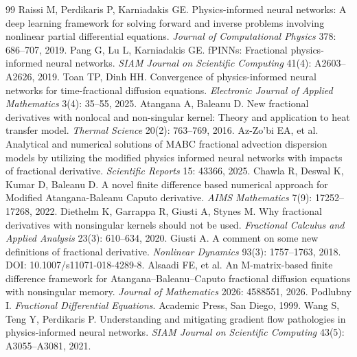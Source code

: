 \documentclass[11pt]{article}
\begin{document}
\begin{thebibliography}{99}
 Raissi M, Perdikaris P, Karniadakis GE. Physics-informed neural networks: A deep learning framework for solving forward and inverse problems involving nonlinear partial differential equations. \emph{Journal of Computational Physics} 378: 686--707, 2019.
 Pang G, Lu L, Karniadakis GE. fPINNs: Fractional physics-informed neural networks. \emph{SIAM Journal on Scientific Computing} 41(4): A2603--A2626, 2019.
 Toan TP, Dinh HH. Convergence of physics-informed neural networks for time-fractional diffusion equations. \emph{Electronic Journal of Applied Mathematics} 3(4): 35--55, 2025.
 Atangana A, Baleanu D. New fractional derivatives with nonlocal and non-singular kernel: Theory and application to heat transfer model. \emph{Thermal Science} 20(2): 763--769, 2016.
 Az-Zo'bi EA, et al. Analytical and numerical solutions of MABC fractional advection dispersion models by utilizing the modified physics informed neural networks with impacts of fractional derivative. \emph{Scientific Reports} 15: 43366, 2025.
 Chawla R, Deswal K, Kumar D, Baleanu D. A novel finite difference based numerical approach for Modified Atangana-Baleanu Caputo derivative. \emph{AIMS Mathematics} 7(9): 17252--17268, 2022.
 Diethelm K, Garrappa R, Giusti A, Stynes M. Why fractional derivatives with nonsingular kernels should not be used. \emph{Fractional Calculus and Applied Analysis} 23(3): 610--634, 2020.
 Giusti A. A comment on some new definitions of fractional derivative. \emph{Nonlinear Dynamics} 93(3): 1757--1763, 2018. DOI: 10.1007/s11071-018-4289-8.
 Alsaadi FE, et al. An M-matrix-based finite difference framework for Atangana--Baleanu--Caputo fractional diffusion equations with nonsingular memory. \emph{Journal of Mathematics} 2026: 4588551, 2026.
 Podlubny I. \emph{Fractional Differential Equations}. Academic Press, San Diego, 1999.
 Wang S, Teng Y, Perdikaris P. Understanding and mitigating gradient flow pathologies in physics-informed neural networks. \emph{SIAM Journal on Scientific Computing} 43(5): A3055--A3081, 2021.
\end{thebibliography}
\end{document}
